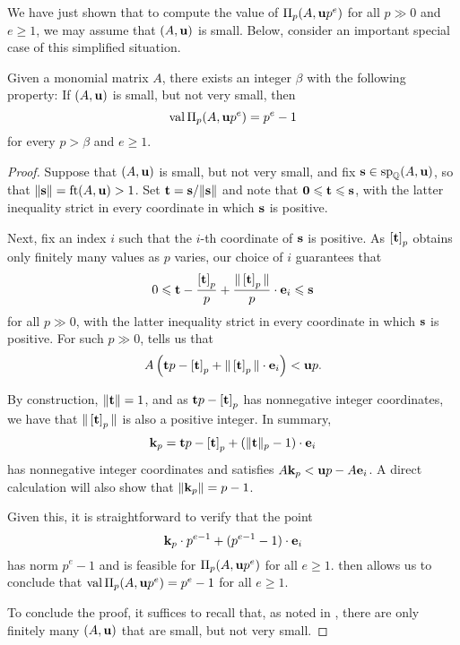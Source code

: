 \documentclass[11pt]{amsart}
\begin{document}
We have just shown that to compute the value of $\Pi_p(A, \mathbf{u}p^e)$ for all $p \gg 0$ and $e \geq 1$, we may assume that $(A, \mathbf{u})$ is small.  Below, consider an important special case of this simplified situation.


\begin{theorem}
\label{trivial max value: T}  Given a monomial matrix $A$, there exists an integer $\beta$ with the following property\textup:   
If $(A, \mathbf{u})$ is small, but not very small, then  \[ \operatorname{val} \Pi_p(A, \mathbf{u}p^e) = p^e-1\] for every $p > \beta$ and $e \geq 1$.
\end{theorem}

\begin{proof} Suppose that $(A, \mathbf{u})$ is small, but not very small, and fix $\mathbf{s} \in \operatorname{sp}_{\mathbb{Q}}(A, \mathbf{u})$, so that $\| \mathbf{s} \| = \operatorname{ft}(A, \mathbf{u}) > 1$.   
Set  $\mathbf{t} = \mathbf{s} / \| \mathbf{s} \|$ and note that $\mathbf{0} \leqslant \mathbf{t} \leqslant \mathbf{s}$, with the latter inequality strict in every coordinate in which $\mathbf{s}$ is positive.  

Next, fix an index $i$ such that the $i$-th coordinate of $\mathbf{s}$ is positive.  As $\left[ \mathbf{t} \right]_p$ obtains only finitely many values as $p$ varies, our choice of $i$ guarantees that 
\[ 0 \leqslant \mathbf{t} - \frac{\left[ \mathbf{t} \right]_p}{p} + \frac{\| \left[ \mathbf{t} \right]_p \|}{p} \cdot \mathbf{e}_i  \leqslant \mathbf{s} \]
for all $p \gg 0$, with the latter inequality strict in every coordinate in which $\mathbf{s}$ is positive.  For such $p \gg 0$,   tells us that 
%
 \[ A \left(  \mathbf{t}p - \left[ \mathbf{t} \right]_p + \| \left[ \mathbf{t} \right]_p \| \cdot \mathbf{e}_i  \right) < \mathbf{u}p. \]
%
 
 By construction, $\| \mathbf{t} \| = 1$, and as $\mathbf{t}p - \left[ \mathbf{t} \right]_p$ has nonnegative integer coordinates, we have that $\| \left[ \mathbf{t} \right]_p \|$ is also a positive integer.  In summary, 
  \[ \mathbf{k}_p  =   \mathbf{t}p - \left[ \mathbf{t} \right]_p+ (\| \mathbf{t} \|_p - 1) \cdot \mathbf{e}_i   \] has nonnegative integer coordinates and satisfies $A \mathbf{k}_p < \mathbf{u}p - A \mathbf{e}_i$.  A direct calculation will also show that $\| \mathbf{k}_p \| = p-1$. 
  
 Given this, it is straightforward to verify that the point
 \[ \mathbf{k}_p \cdot p^{e-1} + (p^{e-1} - 1) \cdot \mathbf{e}_i \]
 has norm $p^e-1$ and is feasible for $\Pi_p(A, \mathbf{u}p^e)$ for all $e \geq 1$.   then allows us to conclude that $\operatorname{val} \Pi_p(A, \mathbf{u}p^e)  = p^e-1$ for all $e \geq 1$.
 
To conclude the proof, it suffices to recall that, as noted in ,  there are only finitely many $(A, \mathbf{u})$ that are small, but not very small.
\end{proof}
\end{document}
